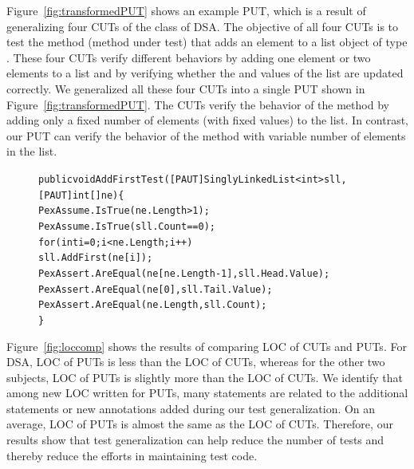 Figure~\ref{fig:transformedPUT} shows an example PUT, which is a result of generalizing four CUTs of the  class of DSA. The objective of all four CUTs is to test the  method (method under test) that adds an element to a list object of type . These four CUTs verify different behaviors by adding one element or two elements to a list and by verifying whether the  and  values of the list are updated correctly. We generalized all these four CUTs into a single PUT shown in Figure~\ref{fig:transformedPUT}. The CUTs verify the behavior of the  method by adding only a fixed number of elements (with fixed values) to the list. In contrast, our PUT can verify the behavior of the  method with variable number of elements in the list. 

\begin{figure}[t]
\begin{CodeOut}
\begin{alltt}
public void AddFirstTest([PAUT]SinglyLinkedList<int> sll, 
\hspace*{0.6in}[PAUT]int[] ne) \{            
\hspace*{0.2in}PexAssume.IsTrue(ne.Length > 1);
\hspace*{0.2in}PexAssume.IsTrue(sll.Count == 0);
\hspace*{0.2in}for (int i = 0; i < ne.Length; i++)
\hspace*{0.4in}sll.AddFirst(ne[i]);
\hspace*{0.2in}PexAssert.AreEqual(ne[ne.Length - 1], sll.Head.Value);            
\hspace*{0.2in}PexAssert.AreEqual(ne[0], sll.Tail.Value);
\hspace*{0.2in}PexAssert.AreEqual(ne.Length, sll.Count);
\}
\end{alltt}
\end{CodeOut}
\end{figure}

Figure~\ref{fig:loccomp} shows the results of comparing LOC of CUTs and PUTs. For DSA, LOC of PUTs is less than the LOC of CUTs, whereas for the other two subjects, LOC of PUTs is slightly more than the LOC of CUTs. We identify that among new LOC written for PUTs, many statements are related to the additional  statements or new annotations added during our test generalization. On an average, LOC of PUTs is almost the same as the LOC of CUTs. Therefore, our results show that test generalization can help reduce the number of tests and thereby reduce the efforts in maintaining test code.

